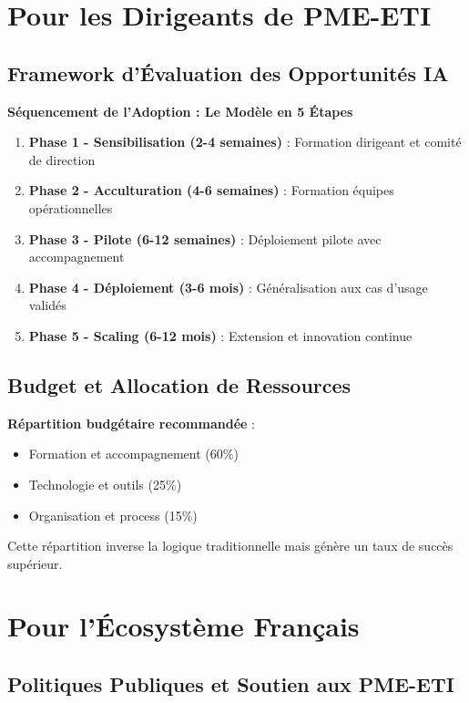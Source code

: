 \documentclass[12pt,a4paper]{report}
\begin{document}
\section{Pour les Dirigeants de PME-ETI}

\subsection{Framework d'Évaluation des Opportunités IA}

\textbf{Séquencement de l'Adoption : Le Modèle en 5 Étapes}
\begin{enumerate}
\item \textbf{Phase 1 - Sensibilisation (2-4 semaines)} : Formation dirigeant et comité de direction
\item \textbf{Phase 2 - Acculturation (4-6 semaines)} : Formation équipes opérationnelles
\item \textbf{Phase 3 - Pilote (6-12 semaines)} : Déploiement pilote avec accompagnement
\item \textbf{Phase 4 - Déploiement (3-6 mois)} : Généralisation aux cas d'usage validés
\item \textbf{Phase 5 - Scaling (6-12 mois)} : Extension et innovation continue
\end{enumerate}

\subsection{Budget et Allocation de Ressources}

\textbf{Répartition budgétaire recommandée} :
\begin{itemize}
\item Formation et accompagnement (60\%)
\item Technologie et outils (25\%)
\item Organisation et process (15\%)
\end{itemize}

Cette répartition inverse la logique traditionnelle mais génère un taux de succès supérieur.

\section{Pour l'Écosystème Français}

\subsection{Politiques Publiques et Soutien aux PME-ETI}
\end{document}
